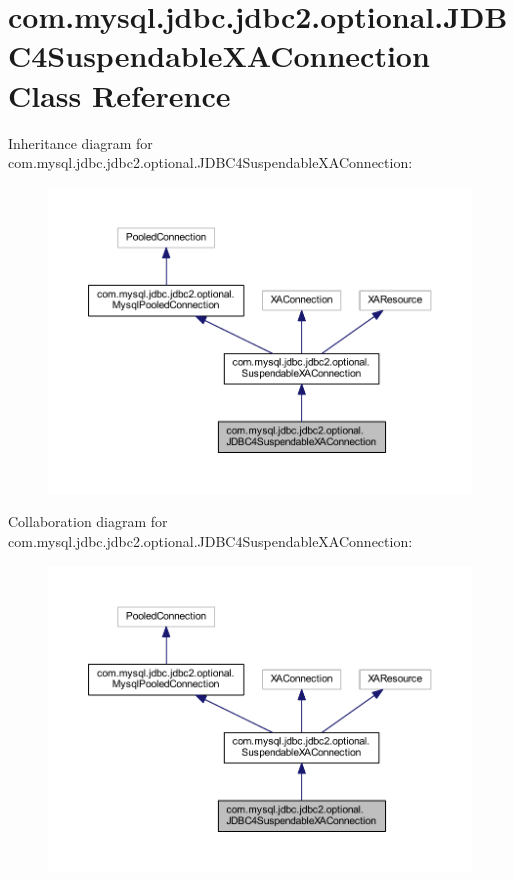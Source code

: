 \hypertarget{classcom_1_1mysql_1_1jdbc_1_1jdbc2_1_1optional_1_1_j_d_b_c4_suspendable_x_a_connection}{}\section{com.\+mysql.\+jdbc.\+jdbc2.\+optional.\+J\+D\+B\+C4\+Suspendable\+X\+A\+Connection Class Reference}
\label{classcom_1_1mysql_1_1jdbc_1_1jdbc2_1_1optional_1_1_j_d_b_c4_suspendable_x_a_connection}


Inheritance diagram for com.\+mysql.\+jdbc.\+jdbc2.\+optional.\+J\+D\+B\+C4\+Suspendable\+X\+A\+Connection\+:
\nopagebreak
\begin{figure}[H]
\begin{center}
\leavevmode
\includegraphics[width=350pt]{classcom_1_1mysql_1_1jdbc_1_1jdbc2_1_1optional_1_1_j_d_b_c4_suspendable_x_a_connection__inherit__graph}
\end{center}
\end{figure}


Collaboration diagram for com.\+mysql.\+jdbc.\+jdbc2.\+optional.\+J\+D\+B\+C4\+Suspendable\+X\+A\+Connection\+:
\nopagebreak
\begin{figure}[H]
\begin{center}
\leavevmode
\includegraphics[width=350pt]{classcom_1_1mysql_1_1jdbc_1_1jdbc2_1_1optional_1_1_j_d_b_c4_suspendable_x_a_connection__coll__graph}
\end{center}
\end{figure}
